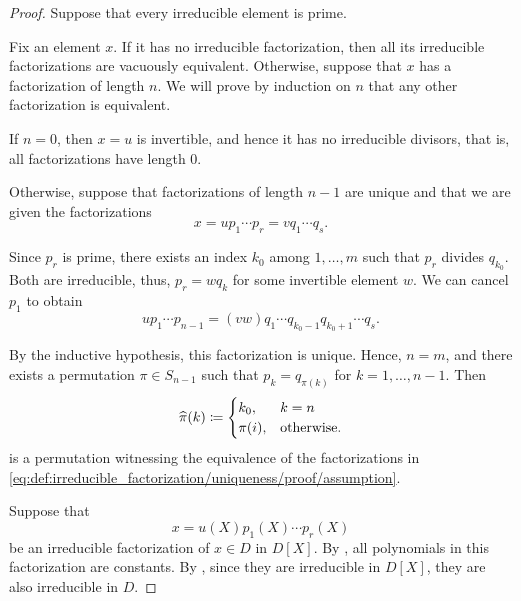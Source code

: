 \begin{proof}
   Suppose that every irreducible element is prime.

  Fix an element \( x \). If it has no irreducible factorization, then all its irreducible factorizations are vacuously equivalent. Otherwise, suppose that \( x \) has a factorization of length \( n \). We will prove by induction on \( n \) that any other factorization is equivalent.

  If \( n = 0 \), then \( x = u \) is invertible, and hence it has no irreducible divisors, that is, all factorizations have length \( 0 \).

  Otherwise, suppose that factorizations of length \( n - 1 \) are unique and that we are given the factorizations
  \begin{equation}\label{eq:def:irreducible_factorization/uniqueness/proof/assumption}
    x = u p_1 \cdots p_r = v q_1 \cdots q_s.
  \end{equation}

  Since \( p_r \) is prime, there exists an index \( k_0 \) among \( 1, \ldots, m \) such that \( p_r \) divides \( q_{k_0} \). Both are irreducible, thus, \( p_r = w q_k \) for some invertible element \( w \). We can cancel \( p_1 \) to obtain
  \begin{equation*}
    u p_1 \cdots p_{n-1} = (vw) q_1 \cdots q_{k_0-1} q_{k_0+1} \cdots q_s.
  \end{equation*}

  By the inductive hypothesis, this factorization is unique. Hence, \( n = m \), and there exists a permutation \( \pi \in S_{n-1} \) such that \( p_k = q_{\pi(k)} \) for \( k = 1, \ldots, n - 1 \). Then
  \begin{equation*}
    \widehat{\pi}(k) \coloneqq \begin{cases}
      k_0,    & k = n \\
      \pi(i), & \T{otherwise.}
    \end{cases}
  \end{equation*}
  is a permutation witnessing the equivalence of the factorizations in \eqref{eq:def:irreducible_factorization/uniqueness/proof/assumption}.


  \SufficiencySubProof* Suppose that
  \begin{equation}\label{eq:thm:def:irreducible_factorization/polynomial_ring/sufficiency_assumption}
    x = u(X) p_1(X) \cdots p_r(X)
  \end{equation}
  be an irreducible factorization of \( x \in D \) in \( D[X] \). By , all polynomials in this factorization are constants. By , since they are irreducible in \( D[X] \), they are also irreducible in \( D \).


\end{proof}
